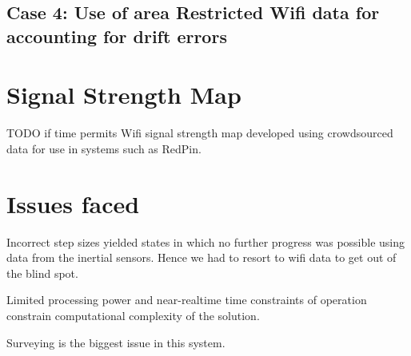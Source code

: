 \subsection{Case 4: Use of area Restricted Wifi data for accounting for drift errors}

\section{Signal Strength Map}

TODO if time permits
Wifi signal strength map developed using crowdsourced data for use in systems such as RedPin.

\section{Issues faced}
Incorrect step sizes yielded states in which no further progress was possible using data from the inertial sensors. Hence we had to resort to wifi data to get out of the blind spot.

Limited processing power and near-realtime time constraints of operation constrain computational 
complexity of the solution.

Surveying is the biggest issue in this system.


